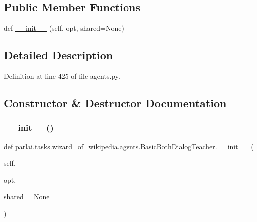 \subsection*{Public Member Functions}
\begin{DoxyCompactItemize}
\item 
def \hyperlink{classparlai_1_1tasks_1_1wizard__of__wikipedia_1_1agents_1_1BasicBothDialogTeacher_a8542415af7170c35c6c5844b28099072}{\+\_\+\+\_\+init\+\_\+\+\_\+} (self, opt, shared=None)
\end{DoxyCompactItemize}


\subsection{Detailed Description}


Definition at line 425 of file agents.\+py.



\subsection{Constructor \& Destructor Documentation}
\mbox{\label{classparlai_1_1tasks_1_1wizard__of__wikipedia_1_1agents_1_1BasicBothDialogTeacher_a8542415af7170c35c6c5844b28099072}} 
\subsubsection{\texorpdfstring{\+\_\+\+\_\+init\+\_\+\+\_\+()}{\_\_init\_\_()}}
{\footnotesize\ttfamily def parlai.\+tasks.\+wizard\+\_\+of\+\_\+wikipedia.\+agents.\+Basic\+Both\+Dialog\+Teacher.\+\_\+\+\_\+init\+\_\+\+\_\+ (\begin{DoxyParamCaption}\item[{}]{self,  }\item[{}]{opt,  }\item[{}]{shared = {\ttfamily None} }\end{DoxyParamCaption})}




